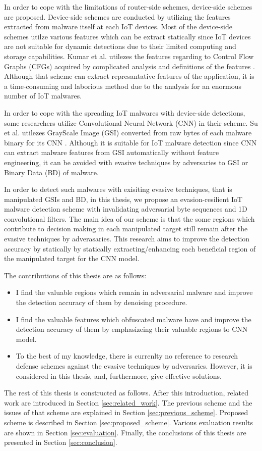 In order to cope with the limitations of router-side schemes, device-side schemes are proposed.
Device-side schemes are conducted by utilizing the features extracted from malware itself at each IoT devices.
Most of the device-side schemes utilze various features which can be extract statically since IoT devices are not suitable for dynamic detections due to their limited computing and storage capabilities.
Kumar et al. utilezes the features regarding to Control Flow Graphs (CFGs) acquired by complicated analysis and definitions of the features \cite{cfg}.
Although that scheme can extract represantative features of the application, it is a time-consuming and laborious method due to the analysis for an enormous number of IoT malwares.

In order to cope with the spreading IoT malwares with device-side detections, some researchers utilize Convolutional Neural Network (CNN) in their scheme.
Su et al. utilezes GrayScale Image (GSI) converted from raw bytes of each malware binary for its CNN \cite{previous}.
Although it is suitable for IoT malware detection since CNN can extract malware features from GSI automatically without feature engineering, it can be avoided with evasive techniques by adversaries to GSI or Binary Data (BD) of malware. 

In order to detect such malwares with exisiting evasive techniques, that is manipulated GSIs and BD, in this thesis, we propose an evasion-resilient IoT malware detection scheme with invalidating adversarial byte sequences and 1D convolutional filters.
The main idea of our scheme is that the some regions which contribute to decision making in each manipulated target still remain after the evasive techniques by adverasaries. 
This research aims to improve the detection accuracy by statically by statically extracting/enhancing each beneficial region of the manipulated target for the CNN model.

The contributions of this thesis are as follows: 
\begin{itemize}
 \item I find the valuable regions which remain in adversarial malware and improve the detection accuracy of them by denoising procedure.
 \item I find the valuable features which obfuscated malware have and improve the detection accuracy of them by emphasizeing their valuable regions to CNN model.
 \item To the best of my knowledge, there is currenlty no reference to research defense schemes against the evasive techniques by adversaries. However, it is considered in this thesis, and, furthermore, give effective solutions.
\end{itemize}

The rest of this thesis is constructed as follows. 
After this introduction, related work are introduced in Section \ref{sec:related_work}.
The previous scheme and the issues of that scheme are explained in Section \ref{sec:previous_scheme}.
Proposed scheme is described in Section \ref{sec:proposed_scheme}.
Various evaluation results are shown in Section \ref{sec:evaluation}.
Finally, the conclusions of this thesis are presented in Section \ref{sec:conclusion}.

